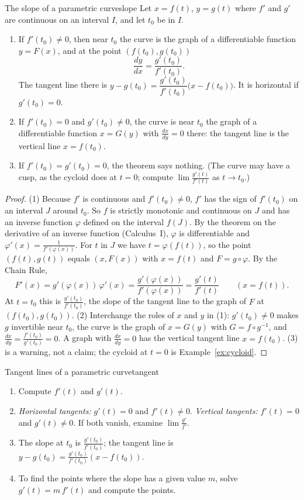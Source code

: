 \documentclass[11pt]{article}
\begin{document}
\begin{thm}{The slope of a parametric curve}{slope}
Let $x=f(t)$, $y=g(t)$ where $f'$ and $g'$ are continuous on an interval $I$, and let $t_0$ be in $I$.
\begin{enumerate}[nosep]
  \item If $f'(t_0)\ne0$, then near $t_0$ the curve is the graph of a differentiable function $y=F(x)$, and at the point $(f(t_0),g(t_0))$
  \[
  \frac{dy}{dx}=\frac{g'(t_0)}{f'(t_0)}.
  \]
  The tangent line there is $y-g(t_0)=\dfrac{g'(t_0)}{f'(t_0)}\bigl(x-f(t_0)\bigr)$. It is horizontal if $g'(t_0)=0$.
  \item If $f'(t_0)=0$ and $g'(t_0)\ne0$, the curve is near $t_0$ the graph of a differentiable function $x=G(y)$ with $\frac{dx}{dy}=0$ there: the tangent line is the vertical line $x=f(t_0)$.
  \item If $f'(t_0)=g'(t_0)=0$, the theorem says nothing. (The curve may have a cusp, as the cycloid does at $t=0$; compute $\lim\frac{g'(t)}{f'(t)}$ as $t\to t_0$.)
\end{enumerate}
\end{thm}
\begin{proof}
(1) Because $f'$ is continuous and $f'(t_0)\ne0$, $f'$ has the sign of $f'(t_0)$ on an interval $J$ around $t_0$. So $f$ is strictly monotonic and continuous on $J$ and has an inverse function $\varphi$ defined on the interval $f(J)$. By the theorem on the derivative of an inverse function (Calculus~I), $\varphi$ is differentiable and $\varphi'(x)=\frac1{f'(\varphi(x))}$. For $t$ in $J$ we have $t=\varphi(f(t))$, so the point $(f(t),g(t))$ equals $(x,F(x))$ with $x=f(t)$ and $F=g\circ\varphi$. By the Chain Rule,
\[
F'(x)=g'(\varphi(x))\,\varphi'(x)=\frac{g'(\varphi(x))}{f'(\varphi(x))}=\frac{g'(t)}{f'(t)}\qquad(x=f(t)).
\]
At $t=t_0$ this is $\frac{g'(t_0)}{f'(t_0)}$, the slope of the tangent line to the graph of $F$ at $(f(t_0),g(t_0))$. (2) Interchange the roles of $x$ and $y$ in (1): $g'(t_0)\ne0$ makes $g$ invertible near $t_0$, the curve is the graph of $x=G(y)$ with $G=f\circ g^{-1}$, and $\frac{dx}{dy}=\frac{f'(t_0)}{g'(t_0)}=0$. A graph with $\frac{dx}{dy}=0$ has the vertical tangent line $x=f(t_0)$. (3) is a warning, not a claim; the cycloid at $t=0$ is Example~\ref{ex:cycloid}.
\end{proof}

\begin{proc}{Tangent lines of a parametric curve}{tangent}
\begin{enumerate}[nosep]
  \item Compute $f'(t)$ and $g'(t)$.
  \item \emph{Horizontal tangents:} $g'(t)=0$ and $f'(t)\ne0$. \emph{Vertical tangents:} $f'(t)=0$ and $g'(t)\ne0$. If both vanish, examine $\lim\frac{g'}{f'}$.
  \item The slope at $t_0$ is $\frac{g'(t_0)}{f'(t_0)}$; the tangent line is $y-g(t_0)=\frac{g'(t_0)}{f'(t_0)}(x-f(t_0))$.
  \item To find the points where the slope has a given value $m$, solve $g'(t)=m\,f'(t)$ and compute the points.
\end{enumerate}
\end{proc}
\end{document}
